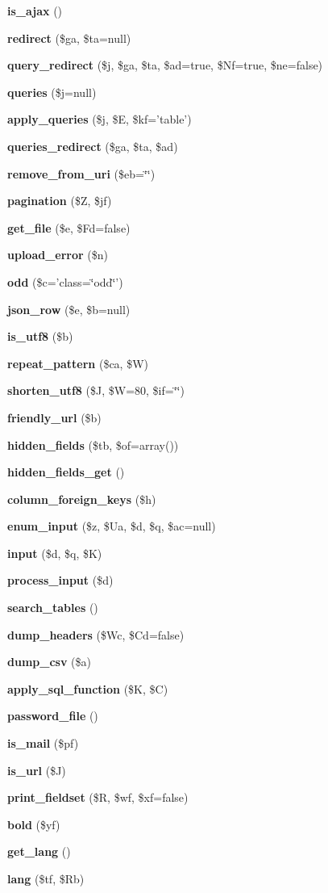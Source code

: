 \begin{DoxyCompactItemize}
\item 
{\bf is\_\-ajax} ()
\item 
{\bf redirect} (\$ga, \$ta=null)
\item 
{\bf query\_\-redirect} (\$j, \$ga, \$ta, \$ad=true, \$Nf=true, \$ne=false)
\item 
{\bf queries} (\$j=null)
\item 
{\bf apply\_\-queries} (\$j, \$E, \$kf='table')
\item 
{\bf queries\_\-redirect} (\$ga, \$ta, \$ad)
\item 
{\bf remove\_\-from\_\-uri} (\$eb=\char`\"{}\char`\"{})
\item 
{\bf pagination} (\$Z, \$jf)
\item 
{\bf get\_\-file} (\$e, \$Fd=false)
\item 
{\bf upload\_\-error} (\$n)
\item 
{\bf odd} (\$c='class=\char`\"{}odd\char`\"{}')
\item 
{\bf json\_\-row} (\$e, \$b=null)
\item 
{\bf is\_\-utf8} (\$b)
\item 
{\bf repeat\_\-pattern} (\$ca, \$W)
\item 
{\bf shorten\_\-utf8} (\$J, \$W=80, \$if=\char`\"{}\char`\"{})
\item 
{\bf friendly\_\-url} (\$b)
\item 
{\bf hidden\_\-fields} (\$tb, \$of=array())
\item 
{\bf hidden\_\-fields\_\-get} ()
\item 
{\bf column\_\-foreign\_\-keys} (\$h)
\item 
{\bf enum\_\-input} (\$z, \$Ua, \$d, \$q, \$ac=null)
\item 
{\bf input} (\$d, \$q, \$K)
\item 
{\bf process\_\-input} (\$d)
\item 
{\bf search\_\-tables} ()
\item 
{\bf dump\_\-headers} (\$Wc, \$Cd=false)
\item 
{\bf dump\_\-csv} (\$a)
\item 
{\bf apply\_\-sql\_\-function} (\$K, \$C)
\item 
{\bf password\_\-file} ()
\item 
{\bf is\_\-mail} (\$pf)
\item 
{\bf is\_\-url} (\$J)
\item 
{\bf print\_\-fieldset} (\$R, \$wf, \$xf=false)
\item 
{\bf bold} (\$yf)
\item 
{\bf get\_\-lang} ()
\item 
{\bf lang} (\$tf, \$Rb)
\end{DoxyCompactItemize}
